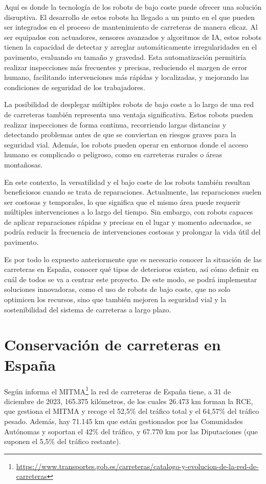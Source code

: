 Aquí es donde la tecnología de los robots de bajo coste puede ofrecer una solución disruptiva. El desarrollo de estos robots ha llegado a un punto en el que pueden ser integrados en el proceso de mantenimiento de carreteras de manera eficaz. Al ser equipados con actuadores, sensores avanzados y algoritmos de \ac{IA}, estos robots tienen la capacidad de detectar y arreglar automáticamente irregularidades en el pavimento, evaluando su tamaño y gravedad. Esta automatización permitiría realizar inspecciones más frecuentes y precisas, reduciendo el margen de error humano, facilitando intervenciones más rápidas y localizadas, y mejorando las condiciones de seguridad de los trabajadores.

La posibilidad de desplegar múltiples robots de bajo coste a lo largo de una red de carreteras también representa una ventaja significativa. Estos robots pueden realizar inspecciones de forma continua, recorriendo largas distancias y detectando problemas antes de que se conviertan en riesgos graves para la seguridad vial. Además, los robots pueden operar en entornos donde el acceso humano es complicado o peligroso, como en carreteras rurales o áreas montañosas.

En este contexto, la versatilidad y el bajo coste de los robots también resultan beneficiosos cuando se trata de reparaciones. Actualmente, las reparaciones suelen ser costosas y temporales, lo que significa que el mismo área puede requerir múltiples intervenciones a lo largo del tiempo. Sin embargo, con robots capaces de aplicar reparaciones rápidas y precisas en el lugar y momento adecuados, se podría reducir la frecuencia de intervenciones costosas y prolongar la vida útil del pavimento. 

Es por todo lo expuesto anteriormente que es necesario conocer la situación de las carreteras en España, conocer qué tipos de deterioros existen, así cómo definir en cuál de todos se va a centrar este proyecto. De este modo, se podrá implementar soluciones innovadoras, como el uso de robots de bajo coste, que no solo optimicen los recursos, sino que también mejoren la seguridad vial y la sostenibilidad del sistema de carreteras a largo plazo.


\section{Conservación de carreteras en España}
\label{sec:conservacioncarreteras}

Según informa el \ac{MITMA}\footnote{\url{https://www.transportes.gob.es/carreteras/catalogo-y-evolucion-de-la-red-de-carreteras}} la red de carreteras de España tiene, a 31 de diciembre de 2023, 165.375 kilómetros, de los cuales 26.473 km forman la \ac{RCE}, que gestiona el \acs{MITMA} y recoge el 52,5\% del tráfico total y el 64,57\% del tráfico pesado. Además, hay 71.145 km que están gestionados por las Comunidades Autónomas y soportan el 42\% del tráfico, y 67.770 km por las Diputaciones (que suponen el 5,5\% del tráfico restante).

